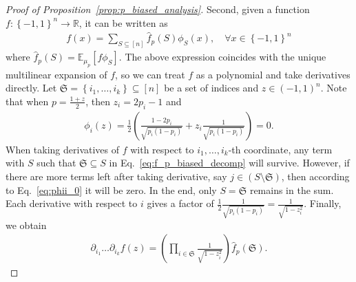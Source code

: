\documentclass[11pt]{article}
\theoremstyle{named}
\theoremstyle{plain}
\newcommand{\real}{\ensuremath{\mathbb{R}}}
\newcommand{\Exs}{\ensuremath{{\mathbb{E}}}}
\newcommand{\parenth}[1]{\left( #1 \right)}
\newcommand{\braces}[1]{\left\{ #1 \right \}}
\begin{document}
\begin{proof}[Proof of Proposition~\ref{prop:p_biased_analysis}]
  Second, given a function $f: \braces{-1,1}^n \to \real$, it can be written as 
  \begin{align}
    \label{eq:f_p_biased_decomp}
    f(x) = \sum_{S \subseteq [n]} \hat{f}_p(S) \phi_S(x), \quad \forall x\in \braces{-1,1}^n
  \end{align}
  where $\hat{f}_p(S) = \Exs_{\mu_p}[f \phi_S]$. The above expression coincides with the unique multilinear expansion of $f$, so we can treat $f$ as a polynomial and take derivatives directly. Let $\mathfrak{S} = \braces{i_1, \ldots, i_k} \subseteq [n]$ be a set of indices and $z \in (-1, 1)^n$. Note that when $p = \frac{1+z}{2}$, then $z_i = 2 p_i - 1$ and 
  \begin{align}
    \label{eq:phii_0}
    \phi_i(z) = \frac{1}{2} \parenth{\frac{1-2p_i}{\sqrt{p_i (1-p_i)}} + z_i \frac{1}{\sqrt{p_i (1-p_i)}} } = 0.
  \end{align}
  When taking derivatives of $f$ with respect to $i_1, \ldots, i_k$-th coordinate, any term with $S$ such that $\mathfrak{S} \subseteq S$ in Eq.~\eqref{eq:f_p_biased_decomp} will survive. However, if there are more terms left after taking derivative, say $j \in (S \setminus \mathfrak{S})$, then according to Eq.~\eqref{eq:phii_0} it will be zero. In the end, only $S = \mathfrak{S}$ remains in the sum. Each derivative with respect to $i$ gives a factor of $\frac{1}{2} \frac{1}{\sqrt{p_{i}(1-p_{i})}} = \frac{1}{\sqrt{1-z_i^2}}$. Finally, we obtain 
  \begin{align*}
    \partial_{i_1} \ldots \partial_{i_k} f(z) = \parenth{\prod_{i\in \mathfrak{S}} \frac{1}{\sqrt{1-z_i^2}}} \hat{f}_p(\mathfrak{S}). 
  \end{align*}

\end{proof}
\end{document}
